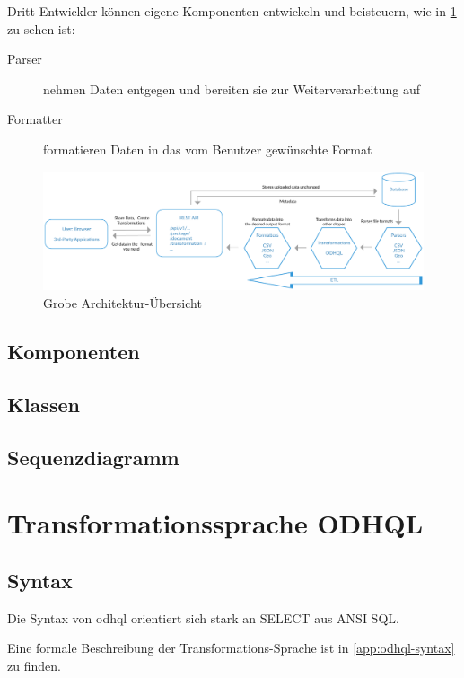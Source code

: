 Dritt-Entwickler können eigene Komponenten entwickeln und beisteuern, wie in \cref{fig:pd:arch-overview} zu sehen ist:
\begin{description}
\item[Parser] nehmen Daten entgegen und bereiten sie zur Weiterverarbeitung auf
\item[Formatter] formatieren Daten in das vom Benutzer gewünschte Format
\end{description}

\begin{figure}[H]
    \centering
    \includegraphics[width=\linewidth]{fig/ODH-Architecture-Overview}
    \caption{Grobe Architektur-Übersicht}
    \label{fig:pd:arch-overview}
\end{figure}

\subsection{Komponenten}


\subsection{Klassen}


\subsection{Sequenzdiagramm}


\section{Transformationssprache ODHQL}

\subsection{Syntax}

Die Syntax von \acs{odhql} orientiert sich stark an SELECT aus ANSI SQL.

Eine formale Beschreibung der Transformations-Sprache ist in \cref{app:odhql-syntax} zu finden.

